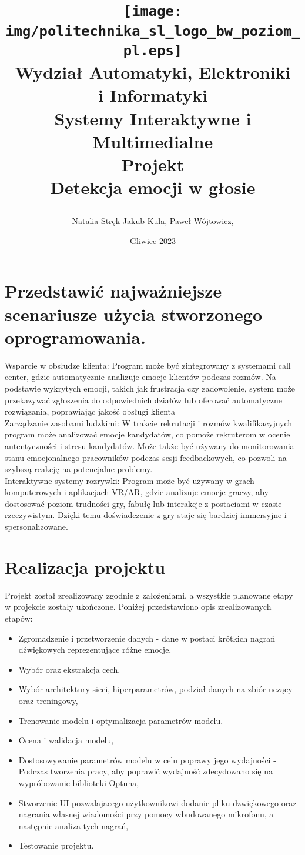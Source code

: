 \documentclass[12pt,titlepage]{article}
\title{
\texttt{[image: img/politechnika\_sl\_logo\_bw\_poziom\_pl.eps]}\\
\textbf{Wydział Automatyki, Elektroniki\\
i Informatyki}\\
\vspace*{1cm}
Systemy Interaktywne i Multimedialne \\ Projekt \\ Detekcja emocji w głosie

\vspace*{5cm}
}
\author{
Natalia Stręk
Jakub Kula,
Paweł Wójtowicz,
}
\date{Gliwice 2023}
\begin{document}
\maketitle


\newpage
\section{Przedstawić najważniejsze scenariusze użycia stworzonego oprogramowania.}
Wsparcie w obsłudze klienta:
Program może być zintegrowany z systemami call center, gdzie automatycznie analizuje emocje klientów podczas rozmów. Na podstawie wykrytych emocji, takich jak frustracja czy zadowolenie, system może przekazywać zgłoszenia do odpowiednich działów lub oferować automatyczne rozwiązania, poprawiając jakość obsługi klienta\\

Zarządzanie zasobami ludzkimi:
W trakcie rekrutacji i rozmów kwalifikacyjnych program może analizować emocje kandydatów, co pomoże rekruterom w ocenie autentyczności i stresu kandydatów. Może także być używany do monitorowania stanu emocjonalnego pracowników podczas sesji feedbackowych, co pozwoli na szybszą reakcję na potencjalne problemy.\\

Interaktywne systemy rozrywki:
Program może być używany w grach komputerowych i aplikacjach VR/AR, gdzie analizuje emocje graczy, aby dostosować poziom trudności gry, fabułę lub interakcje z postaciami w czasie rzeczywistym. Dzięki temu doświadczenie z gry staje się bardziej immersyjne i spersonalizowane.\\

\section{Realizacja projektu}
Projekt został zrealizowany zgodnie z założeniami, a wszystkie planowane etapy w projekcie zostały ukończone. Poniżej przedstawiono opis zrealizowanych etapów:

\begin{itemize}
    \item Zgromadzenie i przetworzenie danych - dane w postaci krótkich nagrań dźwiękowych reprezentujące różne emocje,
    \item Wybór oraz ekstrakcja cech,
    \item Wybór architektury sieci, hiperparametrów, podział danych na zbiór uczący oraz treningowy,
    \item Trenowanie modelu i optymalizacja parametrów modelu.
    \item Ocena i walidacja modelu,
    \item Dostosowywanie parametrów modelu w celu poprawy jego wydajności - Podczas tworzenia pracy, aby poprawić wydajność zdecydowano się na wypróbowanie biblioteki Optuna,
    \item Stworzenie UI pozwalajacego użytkownikowi dodanie pliku dzwiękowego oraz nagrania własnej wiadomości przy pomocy wbudowanego mikrofonu, a następnie analiza tych nagrań,
    \item Testowanie projektu.
\end{itemize}
\end{document}
